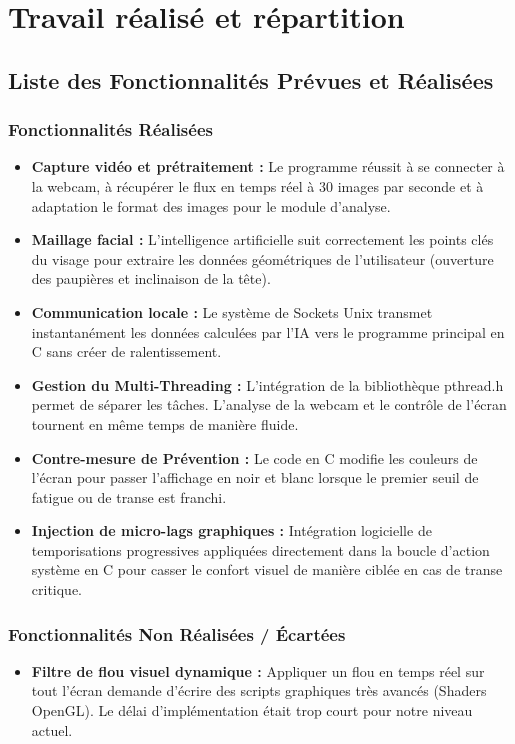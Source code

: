 \documentclass[a4paper, 12pt, twoside]{article}
\begin{document}
\newpage

\section{Travail réalisé et répartition}
\subsection{Liste des Fonctionnalités Prévues et Réalisées}
\subsubsection*{Fonctionnalités Réalisées}
\begin{itemize}
    \item \textbf{Capture vidéo et prétraitement :} Le programme réussit à se connecter à la webcam, à récupérer le flux en temps réel à 30 images par seconde et à adaptation le format des images pour le module d'analyse.
    \item \textbf{Maillage facial :} L'intelligence artificielle suit correctement les points clés du visage pour extraire les données géométriques de l'utilisateur (ouverture des paupières et inclinaison de la tête).
    \item \textbf{Communication locale :} Le système de Sockets Unix transmet instantanément les données calculées par l'IA vers le programme principal en C sans créer de ralentissement.
    \item \textbf{Gestion du Multi-Threading :} L'intégration de la bibliothèque pthread.h permet de séparer les tâches. L'analyse de la webcam et le contrôle de l'écran tournent en même temps de manière fluide.
    \item \textbf{Contre-mesure de Prévention :} Le code en C modifie les couleurs de l'écran pour passer l'affichage en noir et blanc lorsque le premier seuil de fatigue ou de transe est franchi.
    \item \textbf{Injection de micro-lags graphiques :} Intégration logicielle de temporisations progressives appliquées directement dans la boucle d'action système en C pour casser le confort visuel de manière ciblée en cas de transe critique.
\end{itemize}

\subsubsection*{Fonctionnalités Non Réalisées / Écartées}
\begin{itemize}
    \item \textbf{Filtre de flou visuel dynamique :} Appliquer un flou en temps réel sur tout l'écran demande d'écrire des scripts graphiques très avancés (Shaders OpenGL). Le délai d'implémentation était trop court pour notre niveau actuel.
\end{itemize}
\end{document}
